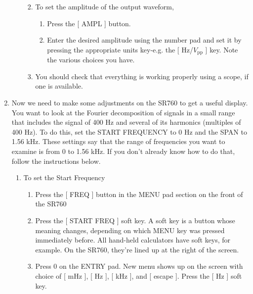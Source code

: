 \documentclass{../lab}
\begin{document}
\begin{enumerate}
\begin{itemize}
\begin{enumerate}
\begin{enumerate}
            \end{enumerate}

            \item To set the amplitude of the output waveform,
            \begin{enumerate}
                \item Press the [ AMPL ] button.

                \item Enter the desired amplitude using the number pad and set it by pressing the appropriate units key-e.g. the [ Hz/$V_\text{pp}$ ] key. Note the various choices you have.

            \end{enumerate}

            \item You should check that everything is working properly using a scope, if one is available.

        \end{enumerate}

    \end{itemize}

    \item Now we need to make some adjustments on the SR760 to get a useful display. You want to look at the Fourier decomposition of signals in a small range that includes the signal of 400 Hz and several of its harmonics (multiples of 400 Hz). To do this, set the START FREQUENCY to 0 Hz and the SPAN to 1.56 kHz. These settings say that the range of frequencies you want to examine is from 0 to 1.56 kHz. If you don't already know how to do that, follow the instructions below.
    \begin{enumerate}
        \item To set the Start Frequency
        \begin{enumerate}
            \item Press the [ FREQ ] button in the MENU pad section on the front of the SR760

            \item Press the [ START FREQ ] soft key. A soft key is a button whose meaning changes, depending on which MENU key was pressed immediately before. All hand-held calculators have soft keys, for example. On the SR760, they're lined up at the right of the screen.

            \item Press 0 on the ENTRY pad. New menu shows up on the screen with choice of [ mHz ], [ Hz ], [ kHz ], and [ escape ]. Press the [ Hz ] soft key.


\end{enumerate}
\end{enumerate}
\end{enumerate}
\end{document}
